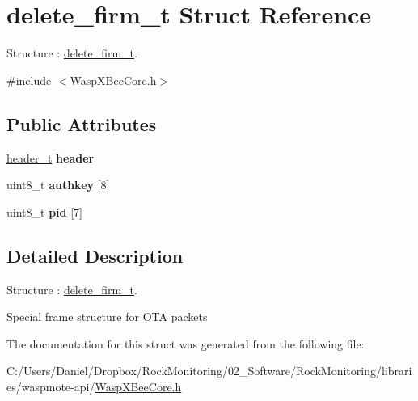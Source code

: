 \hypertarget{structdelete__firm__t}{}\section{delete\+\_\+firm\+\_\+t Struct Reference}
\label{structdelete__firm__t}


Structure \+: \hyperlink{structdelete__firm__t}{delete\+\_\+firm\+\_\+t}.  




{\ttfamily \#include $<$Wasp\+X\+Bee\+Core.\+h$>$}

\subsection*{Public Attributes}
\begin{DoxyCompactItemize}
\item 
\hyperlink{structheader__t}{header\+\_\+t} {\bfseries header}\hypertarget{structdelete__firm__t_a35d902f51a991e5817f0f4b17bf5ca18}{}\label{structdelete__firm__t_a35d902f51a991e5817f0f4b17bf5ca18}

\item 
uint8\+\_\+t {\bfseries authkey} \mbox{[}8\mbox{]}\hypertarget{structdelete__firm__t_a9e1f89e51d6bddd02752a84663ab250f}{}\label{structdelete__firm__t_a9e1f89e51d6bddd02752a84663ab250f}

\item 
uint8\+\_\+t {\bfseries pid} \mbox{[}7\mbox{]}\hypertarget{structdelete__firm__t_a2759e3e275f4327063601ddad871a8ca}{}\label{structdelete__firm__t_a2759e3e275f4327063601ddad871a8ca}

\end{DoxyCompactItemize}


\subsection{Detailed Description}
Structure \+: \hyperlink{structdelete__firm__t}{delete\+\_\+firm\+\_\+t}. 

Special frame structure for O\+TA packets 

The documentation for this struct was generated from the following file\+:\begin{DoxyCompactItemize}
\item 
C\+:/\+Users/\+Daniel/\+Dropbox/\+Rock\+Monitoring/02\+\_\+\+Software/\+Rock\+Monitoring/libraries/waspmote-\/api/\hyperlink{_wasp_x_bee_core_8h}{Wasp\+X\+Bee\+Core.\+h}\end{DoxyCompactItemize}

